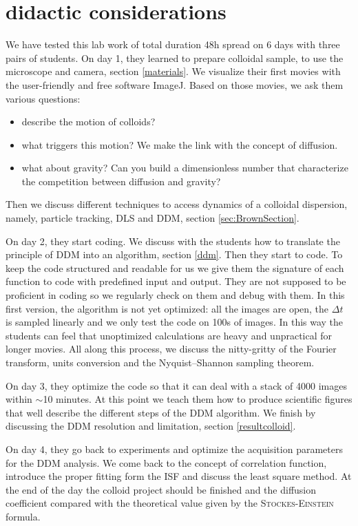 \documentclass[%
 aip,
 jmp,%
 amsmath,amssymb,
reprint,%
]{revtex4-1}
\begin{document}
\section{\label{didac}didactic considerations}
We have tested this lab work of total duration 48h spread on 6 days with three pairs of students. On day 1, they learned to prepare colloidal sample, to use the microscope and camera, section \ref{materials}. We visualize their first movies with the user-friendly and free software  ImageJ. Based on those movies, we ask them various questions:
\begin{itemize}
\item describe the motion of colloids?
\item what triggers this motion? We make the link with the concept of diffusion.
\item what about gravity? Can you build a dimensionless number that characterize the competition between diffusion and gravity? 
\end{itemize}
Then we discuss different techniques to access dynamics of a colloidal dispersion, namely, particle tracking, DLS and DDM, section \ref{sec:BrownSection}. 

On day 2, they start coding. We discuss with the students how to translate the principle of DDM into an algorithm, section \ref{ddm}. Then they start to code. To keep the code structured and readable for us we give them the signature of each function to code with predefined input and output. They are not supposed to be proficient in coding so we regularly check on them and debug with them. In this first version, the algorithm is not yet optimized: all the images are open, the $\Delta t$ is sampled linearly and we only test the code on 100s of images. In this way the students can feel that unoptimized  calculations are heavy and unpractical for longer movies. All along this process, we discuss the nitty-gritty of the Fourier transform, units conversion and the Nyquist–Shannon sampling theorem.

On day 3, they optimize the code so that it can deal with a stack of 4000 images within $\sim$10 minutes. At this point we teach them how to produce scientific figures that well describe the different steps of the DDM algorithm. We finish by discussing the DDM resolution and limitation, section \ref{resultcolloid}.

On day 4, they go back to experiments and optimize the acquisition parameters for the DDM analysis. We come back to the concept of correlation function, introduce the proper fitting form the ISF and discuss the least square method. At the end of the day the colloid project should be finished and the diffusion coefficient compared with the theoretical value given by the \textsc{Stockes-Einstein} formula.
\end{document}
